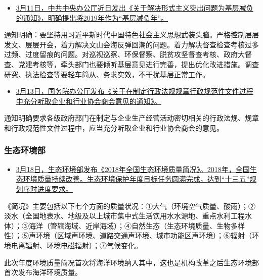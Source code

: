 \documentclass[
]{book}
\providecommand{\tightlist}{%
  \setlength{\itemsep}{0pt}\setlength{\parskip}{0pt}}
\begin{document}
\begin{itemize}
\tightlist
\item
  \href{http://www.gov.cn/zhengce/2019-03/11/content_5372964.htm}{3月11日，中共中央办公厅近日发出《关于解决形式主义突出问题为基层减负的通知》，明确提出将2019年作为``基层减负年''。}
\end{itemize}

通知明确：要坚持用习近平新时代中国特色社会主义思想武装头脑。严格控制层层发文、层层开会，着力解决文山会海反弹回潮的问题。着力解决督查检查考核过多过频、过度留痕的问题。对巡视巡察、环保督察、脱贫攻坚督查考核、政府大督查、党建考核等，牵头部门也要倾听基层意见进行完善，提出优化改进措施。调查研究、执法检查等要轻车简从、务求实效，不干扰基层正常工作。

\begin{itemize}
\tightlist
\item
  \href{http://www.gov.cn/zhengce/content/2019-03/13/content_5373423.htm}{3月13日，国务院办公厅发布《关于在制定行政法规规章行政规范性文件过程中充分听取企业和行业协会商会意见的通知》。}
\end{itemize}

通知明确要求各级政府部门在制定与企业生产经营活动密切相关的行政法规、规章和行政规范性文件过程中，应当充分听取企业和行业协会商会的意见。

\hypertarget{ux751fux6001ux73afux5883ux90e8-2}{%
\subsubsection*{生态环境部}\label{ux751fux6001ux73afux5883ux90e8-2}}

\begin{itemize}
\tightlist
\item
  \href{http://www.mee.gov.cn/xxgk2018/xxgk/xxgk15/201903/t20190318_696301.html}{3月18日，生态环境部发布《2018年全国生态环境质量简况》。2018年，全国生态环境质量持续改善。生态环境保护年度目标任务圆满完成，达到``十三五''规划序时进度要求。}
\end{itemize}

《简况》主要包括以下七个方面的质量状况：①大气（环境空气质量、酸雨）；②淡水（全国地表水、地级及以上城市集中式生活饮用水水源地、重点水利工程水体）；③海洋（管辖海域、近岸海域）；④自然生态（生态环境质量、生物多样性）；⑤声环境（区域声环境、道路交通声环境、城市功能区声环境）；⑥辐射（环境电离辐射、环境电磁辐射）；⑦气候变化。

此次年度环境质量简况首次将海洋环境纳入其中，这也是机构改革之后生态环境部首次发布海洋环境质量。
\end{document}
